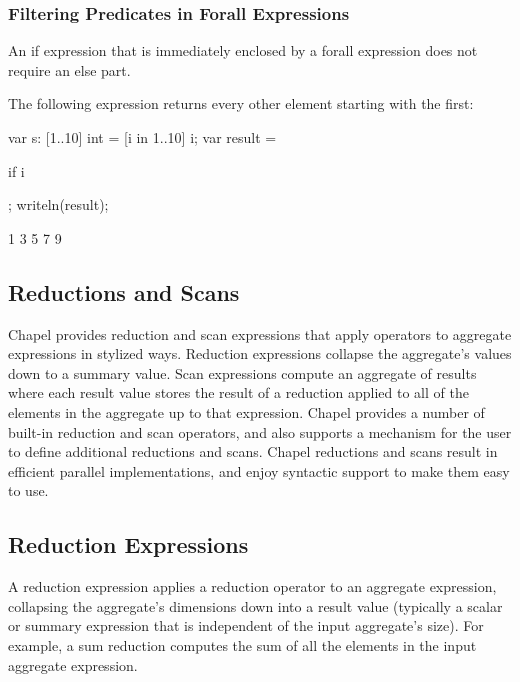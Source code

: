 \subsubsection{Filtering Predicates in Forall Expressions}
\label{Filtering_Predicates_Forall}

An if expression that is immediately enclosed by a forall expression
does not require an else part.
\begin{example}
The following expression returns every other element starting with the
first:
\begin{chapelpre}
var s: [1..10] int = [i in 1..10] i;
var result =
\end{chapelpre}
\begin{chapel}
[i in 1..s.numElements] if i %
\end{chapel}
\begin{chapelpost}
;
writeln(result);
\end{chapelpost}
\begin{chapeloutput}
1 3 5 7 9
\end{chapeloutput}
\end{example}

\subsection{Reductions and Scans}
\label{Reductions_and_Scans}

Chapel provides reduction and scan expressions that apply operators to
aggregate expressions in stylized ways.  Reduction expressions
collapse the aggregate's values down to a summary value.  Scan
expressions compute an aggregate of results where each result value
stores the result of a reduction applied to all of the elements in the
aggregate up to that expression.  Chapel provides a number of built-in
reduction and scan operators, and also supports a mechanism for the
user to define additional reductions and scans.  Chapel reductions and
scans result in efficient parallel implementations, and enjoy
syntactic support to make them easy to use.


\subsection{Reduction Expressions}
\label{reduce}

A reduction expression applies a reduction operator to an aggregate
expression, collapsing the aggregate's dimensions down into a result
value (typically a scalar or summary expression that is independent of
the input aggregate's size).  For example, a sum reduction computes
the sum of all the elements in the input aggregate expression.

